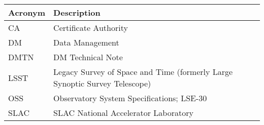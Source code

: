 \addtocounter{table}{-1}
\begin{longtable}{p{}p{}}\hline
\textbf{Acronym} & \textbf{Description}  \\\hline

CA & Certificate Authority \\\hline
DM & Data Management \\\hline
DMTN & DM Technical Note \\\hline
LSST & Legacy Survey of Space and Time (formerly Large Synoptic Survey Telescope) \\\hline
OSS & Observatory System Specifications; LSE-30 \\\hline
SLAC & SLAC National Accelerator Laboratory \\\hline
\end{longtable}
